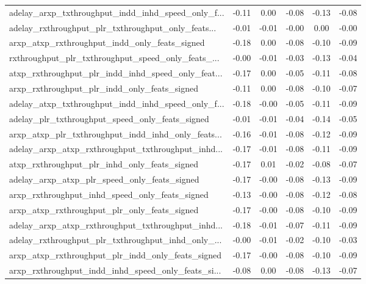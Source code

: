 \begin{tabular}{|l|*{4}{c}|r|}
adelay\_arxp\_txthroughput\_indd\_inhd\_speed\_only\_f... & -0.11 &  0.00 &   -0.08 &      -0.13 & -0.08 \\
adelay\_rxthroughput\_plr\_txthroughput\_only\_feats... & -0.01 & -0.01 &   -0.00 &       0.00 & -0.00 \\
arxp\_atxp\_rxthroughput\_indd\_only\_feats\_signed      & -0.18 &  0.00 &   -0.08 &      -0.10 & -0.09 \\
rxthroughput\_plr\_txthroughput\_speed\_only\_feats\_... & -0.00 & -0.01 &   -0.03 &      -0.13 & -0.04 \\
atxp\_rxthroughput\_plr\_indd\_inhd\_speed\_only\_feat... & -0.17 &  0.00 &   -0.05 &      -0.11 & -0.08 \\
arxp\_rxthroughput\_plr\_indd\_only\_feats\_signed       & -0.11 &  0.00 &   -0.08 &      -0.10 & -0.07 \\
adelay\_atxp\_txthroughput\_indd\_inhd\_speed\_only\_f... & -0.18 & -0.00 &   -0.05 &      -0.11 & -0.09 \\
adelay\_plr\_txthroughput\_speed\_only\_feats\_signed    & -0.01 & -0.01 &   -0.04 &      -0.14 & -0.05 \\
arxp\_atxp\_plr\_txthroughput\_indd\_inhd\_only\_feats... & -0.16 & -0.01 &   -0.08 &      -0.12 & -0.09 \\
adelay\_arxp\_atxp\_rxthroughput\_txthroughput\_inhd... & -0.17 & -0.01 &   -0.08 &      -0.11 & -0.09 \\
atxp\_rxthroughput\_plr\_inhd\_only\_feats\_signed       & -0.17 &  0.01 &   -0.02 &      -0.08 & -0.07 \\
adelay\_arxp\_atxp\_plr\_speed\_only\_feats\_signed       & -0.17 & -0.00 &   -0.08 &      -0.13 & -0.09 \\
arxp\_rxthroughput\_inhd\_speed\_only\_feats\_signed     & -0.13 & -0.00 &   -0.08 &      -0.12 & -0.08 \\
arxp\_atxp\_rxthroughput\_plr\_only\_feats\_signed       & -0.17 & -0.00 &   -0.08 &      -0.10 & -0.09 \\
adelay\_arxp\_atxp\_rxthroughput\_txthroughput\_inhd... & -0.18 & -0.01 &   -0.07 &      -0.11 & -0.09 \\
adelay\_rxthroughput\_plr\_txthroughput\_inhd\_only\_... & -0.00 & -0.01 &   -0.02 &      -0.10 & -0.03 \\
arxp\_atxp\_rxthroughput\_plr\_indd\_only\_feats\_signed  & -0.17 & -0.00 &   -0.08 &      -0.10 & -0.09 \\
arxp\_rxthroughput\_indd\_inhd\_speed\_only\_feats\_si... & -0.08 &  0.00 &   -0.08 &      -0.13 & -0.07 \\

\end{tabular}
